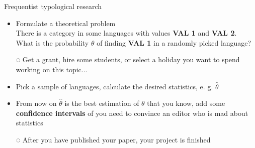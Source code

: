 \documentclass[13pt, t]{beamer}
\begin{document}
\begin{frame}{Frequentist typological research}
\begin{itemize}
\item Formulate a theoretical problem\\ %
There is a category in some languages with values \textbf{VAL 1} and \textbf{VAL 2}. \pause \\
What is the probability $\theta$ of finding \textbf{VAL 1} in a randomly picked language? \pause
\item[◌] Get a grant, hire some students, or select a holiday you want to spend working on this topic... \pause
\item Pick a sample of languages, calculate the desired statistics, e. g. $\hat{\theta}$ \pause
\item From now on $\hat{\theta}$ is the best estimation of $\theta$ that you know\pause, add some \textbf{confidence intervals} of you need to convince an editor who is mad about statistics
\item[◌] After you have published your paper, your project is finished
\end{itemize}
\end{frame}
\end{document}
